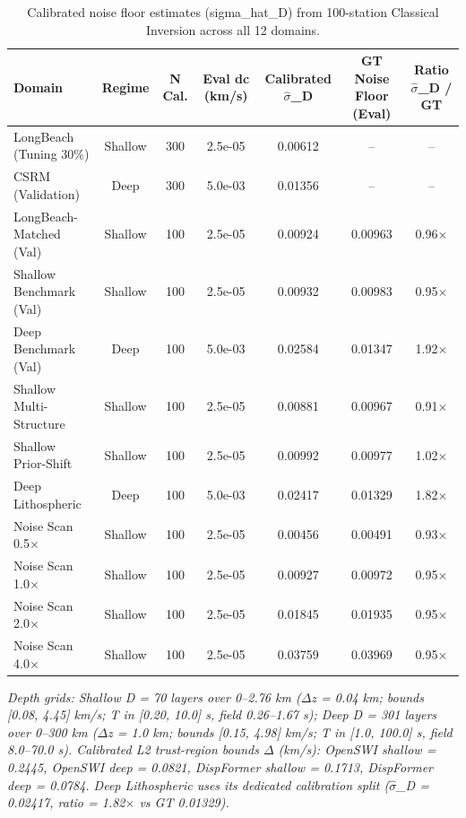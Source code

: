 \begin{table}[t]
\centering
\scriptsize
\caption{Calibrated noise floor estimates (sigma\_hat\_D) from 100-station Classical Inversion across all 12 domains.}
\label{tab:supp_noise_floor_calibration}
\begin{tabular}{lcccccc}
\toprule
Domain & Regime & N Cal. & Eval dc (km/s) & Calibrated $\hat{\sigma}$\_D & GT Noise Floor (Eval) & Ratio $\hat{\sigma}$\_D / GT \\
\midrule
LongBeach (Tuning 30\%) & Shallow & 300 & 2.5e-05 & 0.00612 & -- & -- \\
CSRM (Validation) & Deep & 300 & 5.0e-03 & 0.01356 & -- & -- \\
LongBeach-Matched (Val) & Shallow & 100 & 2.5e-05 & 0.00924 & 0.00963 & 0.96$\times$ \\
Shallow Benchmark (Val) & Shallow & 100 & 2.5e-05 & 0.00932 & 0.00983 & 0.95$\times$ \\
Deep Benchmark (Val) & Deep & 100 & 5.0e-03 & 0.02584 & 0.01347 & 1.92$\times$ \\
Shallow Multi-Structure & Shallow & 100 & 2.5e-05 & 0.00881 & 0.00967 & 0.91$\times$ \\
Shallow Prior-Shift & Shallow & 100 & 2.5e-05 & 0.00992 & 0.00977 & 1.02$\times$ \\
Deep Lithospheric & Deep & 100 & 5.0e-03 & 0.02417 & 0.01329 & 1.82$\times$ \\
Noise Scan 0.5$\times$ & Shallow & 100 & 2.5e-05 & 0.00456 & 0.00491 & 0.93$\times$ \\
Noise Scan 1.0$\times$ & Shallow & 100 & 2.5e-05 & 0.00927 & 0.00972 & 0.95$\times$ \\
Noise Scan 2.0$\times$ & Shallow & 100 & 2.5e-05 & 0.01845 & 0.01935 & 0.95$\times$ \\
Noise Scan 4.0$\times$ & Shallow & 100 & 2.5e-05 & 0.03759 & 0.03969 & 0.95$\times$ \\
\bottomrule
\end{tabular}
\par\vspace{2pt}\noindent\footnotesize{\textit{Depth grids: Shallow D = 70 layers over 0--2.76 km ($\Delta$z = 0.04 km; bounds [0.08, 4.45] km/s; T in [0.20, 10.0] s, field 0.26--1.67 s); Deep D = 301 layers over 0--300 km ($\Delta$z = 1.0 km; bounds [0.15, 4.98] km/s; T in [1.0, 100.0] s, field 8.0--70.0 s). Calibrated L2 trust-region bounds $\Delta$ (km/s): OpenSWI shallow = 0.2445, OpenSWI deep = 0.0821, DispFormer shallow = 0.1713, DispFormer deep = 0.0784. Deep Lithospheric uses its dedicated calibration split ($\hat{\sigma}$\_D = 0.02417, ratio = 1.82$\times$ vs GT 0.01329).}}
\end{table}
